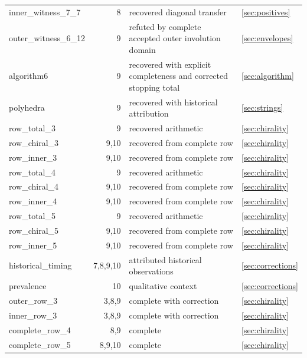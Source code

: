 \begin{longtable}{p{}rp{}l}
inner\_witness\_7\_7&8&recovered diagonal transfer&\ref{sec:positives}\\
outer\_witness\_6\_12&9&refuted by complete accepted outer involution domain&\ref{sec:envelopes}\\
algorithm6&9&recovered with explicit completeness and corrected stopping total&\ref{sec:algorithm}\\
polyhedra&9&recovered with historical attribution&\ref{sec:strings}\\
row\_total\_3&9&recovered arithmetic&\ref{sec:chirality}\\
row\_chiral\_3&9,10&recovered from complete row&\ref{sec:chirality}\\
row\_inner\_3&9,10&recovered from complete row&\ref{sec:chirality}\\
row\_total\_4&9&recovered arithmetic&\ref{sec:chirality}\\
row\_chiral\_4&9,10&recovered from complete row&\ref{sec:chirality}\\
row\_inner\_4&9,10&recovered from complete row&\ref{sec:chirality}\\
row\_total\_5&9&recovered arithmetic&\ref{sec:chirality}\\
row\_chiral\_5&9,10&recovered from complete row&\ref{sec:chirality}\\
row\_inner\_5&9,10&recovered from complete row&\ref{sec:chirality}\\
historical\_timing&7,8,9,10&attributed historical observations&\ref{sec:corrections}\\
prevalence&10&qualitative context&\ref{sec:corrections}\\
outer\_row\_3&3,8,9&complete with correction&\ref{sec:chirality}\\
inner\_row\_3&3,8,9&complete with correction&\ref{sec:chirality}\\
complete\_row\_4&8,9&complete&\ref{sec:chirality}\\
complete\_row\_5&8,9,10&complete&\ref{sec:chirality}\\
\bottomrule\end{longtable}
\normalsize
